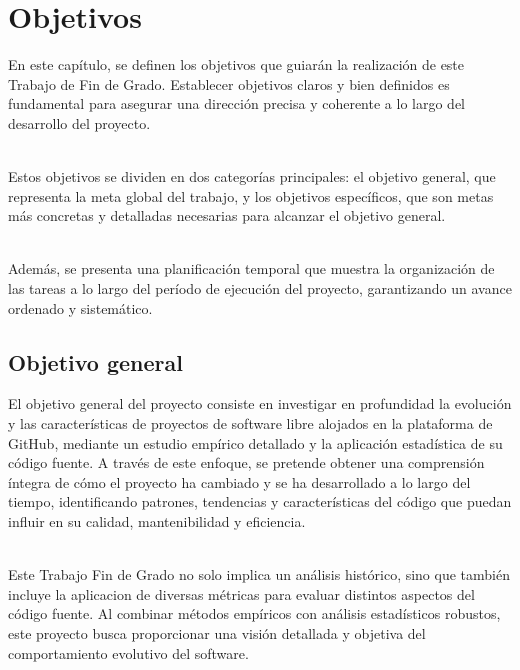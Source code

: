 \documentclass[a4paper, 12pt]{book}
\begin{document}

\cleardoublepage %
\chapter{Objetivos} %
\label{chap:objetivos} %

En este capítulo, se definen los objetivos que guiarán la realización de este Trabajo de Fin de Grado.
Establecer objetivos claros y bien definidos es fundamental para asegurar una dirección precisa y coherente
a lo largo del desarrollo del proyecto.

\\Estos objetivos se dividen en dos categorías principales: el objetivo general,
que representa la meta global del trabajo, y los objetivos específicos, que son metas más concretas y detalladas necesarias
para alcanzar el objetivo general. 

\\Además, se presenta una planificación temporal que muestra la organización de las tareas a lo largo
del período de ejecución del proyecto, garantizando un avance ordenado y sistemático.

\section{Objetivo general} %
\label{sec:objetivo-general} %

El objetivo general del proyecto consiste en investigar en profundidad la evolución y las características de proyectos de software libre
alojados en la plataforma de GitHub, mediante un estudio empírico detallado y la aplicación estadística de su código fuente. 
A través de este enfoque, se pretende obtener una comprensión íntegra de cómo el proyecto ha cambiado y se ha desarrollado a lo
largo del tiempo, identificando patrones, tendencias y características del código que puedan influir en su calidad, mantenibilidad y eficiencia.

\\Este Trabajo Fin de Grado no solo implica un análisis histórico, sino que también incluye la aplicacion de diversas métricas
para evaluar distintos aspectos del código fuente. 
Al combinar métodos empíricos con análisis estadísticos robustos, este proyecto busca proporcionar una visión detallada y objetiva
del comportamiento evolutivo del software.
\end{document}
